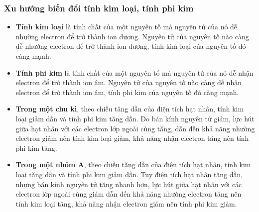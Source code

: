 \subsubsection{Xu hướng biến đổi tính kim loại, tính phi kim}
\vspace{0.25cm}
\begin{tomtat}
	\begin{itemize}
		\item \textbf{Tính kim loại} là tính chất của một nguyên tố mà nguyên tử của nó dễ nhường electron để trở thành ion dương. Nguyên tử của nguyên tố nào càng dễ nhường electron để trở thành ion dương, tính kim loại của nguyên tố đó càng mạnh.
		\item \textbf{Tính phi kim} là tính chất của một nguyên tố mà nguyên tử của nó dễ nhận electron để trở thành ion âm. Nguyên tử của nguyên tố nào càng dễ nhận electron để trở thành ion âm, tính phi kim của nguyên tố đó càng mạnh.
	\end{itemize}
	\begin{itemize}
		\item  \textbf{Trong một chu kì}, theo chiều tăng dần của điện tích hạt nhân, tính kim loại giảm dần và tính phi kim tăng dần. Do bán kính nguyên tử giảm, lực hút giữa hạt nhân với các electron lớp ngoài cùng tăng, dẫn đến khả năng nhường electron giảm nên tính kim loại giảm, khả năng nhận electron tăng nên tính phi kim tăng.
		\item  \textbf{Trong một nhóm A}, theo chiều tăng dần của điện tích hạt nhân, tính kim loại tăng dần và tính phi kim giảm dần. Tuy điện tích hạt nhân tăng dần, nhưng bán kính nguyên tử tăng nhanh hơn, lực hút giữa hạt nhân với các electron lớp ngoài cùng giảm dẫn đến khả năng nhường electron tăng nên tính kim loại tăng, khả năng nhận electron giảm nên tính phi kim giảm.
	\end{itemize}
\end{tomtat}